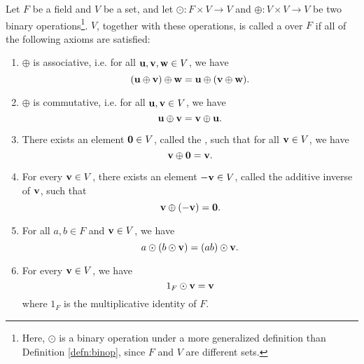 \begin{defn}
Let $ F $ be a field and $ V $ be a set, and let $ \odot:F\times V\to V $ and $ \oplus:V\times V\to V $ be two binary operations\footnote{Here, $ \odot $ is a binary operation under a more generalized definition than Definition \ref{defn:binop}, since $ F $ and $ V $ are different sets.}. $ V $, together with these operations, is called a  over $ F $ if all of the following axioms are satisfied:
\begin{enumerate}
    \item $ \oplus $ is associative, i.e. for all $ \boldsymbol{\mathbf{u}},\boldsymbol{\mathbf{v}},\boldsymbol{\mathbf{w}}\in V $, we have
    \begin{equation*}
        (\boldsymbol{\mathbf{u}}\oplus\boldsymbol{\mathbf{v}})\oplus\boldsymbol{\mathbf{w}}=\boldsymbol{\mathbf{u}}\oplus(\boldsymbol{\mathbf{v}}\oplus\boldsymbol{\mathbf{w}}).
    \end{equation*}

    \item $ \oplus $ is commutative, i.e. for all $ \boldsymbol{\mathbf{u}},\boldsymbol{\mathbf{v}}\in V $, we have
    \begin{equation*}
        \boldsymbol{\mathbf{u}}\oplus\boldsymbol{\mathbf{v}}=\boldsymbol{\mathbf{v}}\oplus\boldsymbol{\mathbf{u}}.
    \end{equation*}

    \item There exists an element $ \boldsymbol{\mathbf{0}}\in V $, called the , such that for all $ \boldsymbol{\mathbf{v}}\in V $, we have
    \begin{equation*}
        \boldsymbol{\mathbf{v}}\oplus\boldsymbol{\mathbf{0}}=\boldsymbol{\mathbf{v}}.
    \end{equation*}

    \item For every $ \boldsymbol{\mathbf{v}}\in V $, there exists an element $ -\boldsymbol{\mathbf{v}}\in V $, called the additive inverse of $ \boldsymbol{\mathbf{v}} $, such that
    \begin{equation*}
        \boldsymbol{\mathbf{v}}\oplus(-\boldsymbol{\mathbf{v}})=\boldsymbol{\mathbf{0}}.
    \end{equation*}

    \item For all $ a,b\in F $ and $ \boldsymbol{\mathbf{v}}\in V $, we have
    \begin{equation*}
        a\odot (b\odot\boldsymbol{\mathbf{v}})=(ab)\odot\boldsymbol{\mathbf{v}}.
    \end{equation*}

    \item For every $ \boldsymbol{\mathbf{v}}\in V $, we have
    \begin{equation*}
        1_F\odot\boldsymbol{\mathbf{v}}=\boldsymbol{\mathbf{v}}
    \end{equation*}
    where $ 1_F $ is the multiplicative identity of $ F $.


\end{enumerate}
\end{defn}
